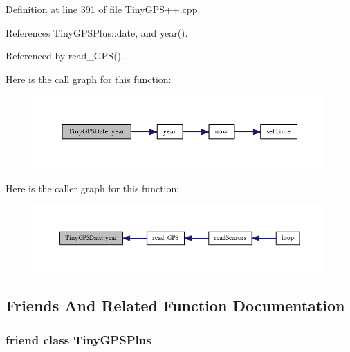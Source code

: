 Definition at line 391 of file Tiny\+G\+P\+S++.\+cpp.



References Tiny\+G\+P\+S\+Plus\+::date, and year().



Referenced by read\+\_\+\+G\+P\+S().



Here is the call graph for this function\+:\nopagebreak
\begin{figure}[H]
\begin{center}
\leavevmode
\includegraphics[width=350pt]{struct_tiny_g_p_s_date_ae2cc914fec377b429d99f01204f50d60_cgraph}
\end{center}
\end{figure}




Here is the caller graph for this function\+:\nopagebreak
\begin{figure}[H]
\begin{center}
\leavevmode
\includegraphics[width=350pt]{struct_tiny_g_p_s_date_ae2cc914fec377b429d99f01204f50d60_icgraph}
\end{center}
\end{figure}




\subsection{Friends And Related Function Documentation}
\subsubsection[{\texorpdfstring{Tiny\+G\+P\+S\+Plus}{TinyGPSPlus}}]{\setlength{\rightskip}{0pt plus 5cm}friend class {\bf Tiny\+G\+P\+S\+Plus}\hspace{0.3cm}{\ttfamily [friend]}}\hypertarget{struct_tiny_g_p_s_date_a6501fd5ef19ae166d43e0e5781609ee2}{}\label{struct_tiny_g_p_s_date_a6501fd5ef19ae166d43e0e5781609ee2}


